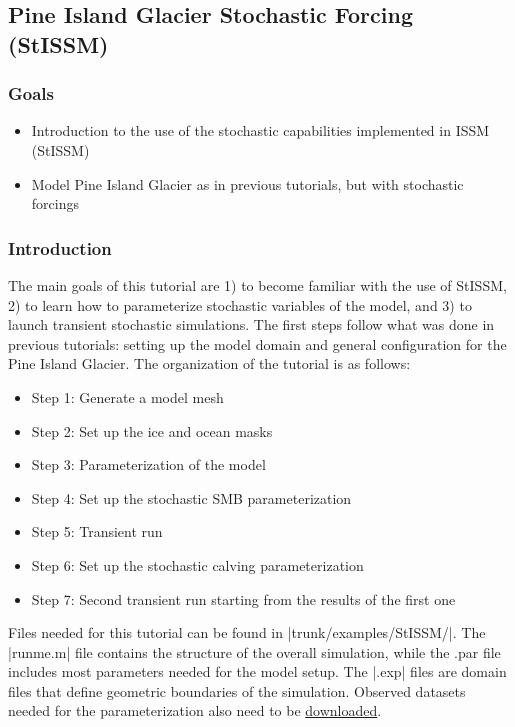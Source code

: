 
\subsection{Pine Island Glacier Stochastic Forcing (StISSM)} \label{sec:using-issm-tutorials-pigstissm}
\subsubsection{Goals} %
\begin{itemize}
	\item Introduction to the use of the stochastic capabilities implemented in ISSM (StISSM)
	\item Model Pine Island Glacier as in previous tutorials, but with stochastic forcings
\end{itemize}

\subsubsection{Introduction}%
The main goals of this tutorial are 1) to become familiar with the use of StISSM, 2) to learn how to parameterize stochastic variables of the model, and 3) to launch transient stochastic simulations. The first steps follow what was done in previous tutorials: setting up the model domain and general configuration for the Pine Island Glacier. The organization of the tutorial is as follows:
\begin{itemize}
	\item Step 1: Generate a model mesh
	\item Step 2: Set up the ice and ocean masks
	\item Step 3: Parameterization of the model
	\item Step 4: Set up the stochastic SMB parameterization
	\item Step 5: Transient run
	\item Step 6: Set up the stochastic calving parameterization
	\item Step 7: Second transient run starting from the results of the first one
\end{itemize}
Files needed for this tutorial can be found in \lstinlinebg|trunk/examples/StISSM/|. The \lstinlinebg|runme.m| file contains the structure of the overall simulation, while the .par file includes most parameters needed for the model setup. The \lstinlinebg|.exp| files are domain files that define geometric boundaries of the simulation. Observed datasets needed for the parameterization also need to be 
\hyperref[sec:using-issm-tutorials-datasets]{downloaded}.


